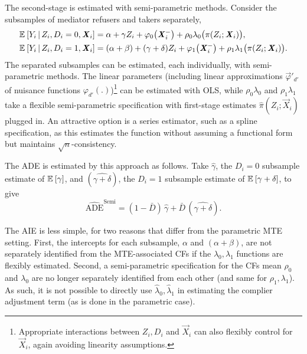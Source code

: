The second-stage is estimated with semi-parametric methods.
Consider the subsamples of mediator refusers and takers separately,
\begin{align*}
    \mathbb{E}_{} \left[ Y_i \, \middle\vert \, Z_i, D_i = 0, \boldsymbol{\mathit{X}}_i \right] &=
        \alpha + \gamma Z_i + \varphi_0\big( \boldsymbol{\mathit{X}}_i^- \big)
        + \rho_0 \lambda_0 \big( \pi(Z_i ; \boldsymbol{\mathit{X}}_i) \big), \\
    \mathbb{E}_{} \left[ Y_i \, \middle\vert \, Z_i, D_i = 1, \boldsymbol{\mathit{X}}_i \right] &=
        (\alpha + \beta) + (\gamma + \delta) Z_i + \varphi_1\big( \boldsymbol{\mathit{X}}_i^- \big)
        + \rho_1 \lambda_1 \big( \pi(Z_i ; \boldsymbol{\mathit{X}}_i) \big).
\end{align*}
The separated subsamples can be estimated, each individually, with semi-parametric methods.
The linear parameters (including linear approximations $\vec \varphi'_{d'}$ of nuisance functions $\varphi_{d'}(.)$)\footnote{
    Appropriate interactions between $Z_i, D_i$ and $\vec X_i$ can also flexibly control for $\vec X_i$, again avoiding linearity assumptions.
} can be estimated with OLS, while $\rho_0 \lambda_0$ and $\rho_1 \lambda_1$ take a flexible semi-parametric specification with first-stage estimates $\hat \pi(Z_i; \vec X_i)$ plugged in.
An attractive option is a series estimator, such as a spline specification, as this estimates the function without assuming a functional form but maintains $\sqrt n$-consistency.

The ADE is estimated by this approach as follows.
Take $\hat \gamma$, the $D_i = 0$ subsample estimate of $\mathbb{E}_{} \left[ \gamma \right]$, and $(\hat{\gamma + \delta})$, the $D_i = 1$ subsample estimate of $\mathbb{E}_{} \left[ \gamma + \delta \right]$, to give
\[ \hat{\text{ADE}}^{\text{Semi}}
    = (1 - \bar D) \, \hat \gamma + \bar D \, (\hat{\gamma + \delta}). \]

The AIE is less simple, for two reasons that differ from the parametric MTE setting.
First, the intercepts for each subsample, $\alpha$ and $(\alpha + \beta)$, are not separately identified from the MTE-associated CFs if the $\lambda_0, \lambda_1$ functions are flexibly estimated.
Second, a semi-parametric specification for the CFs mean $\rho_0$ and $\lambda_0$ are no longer separately identified from each other (and same for $\rho_1,\lambda_1$).
As such, it is not possible to directly use $\hat \lambda_0, \hat \lambda_1$ in estimating the complier adjustment term (as is done in the parametric case).

